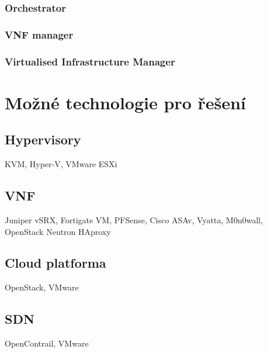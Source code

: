 	\subsubsection{Orchestrator}

	\subsubsection{VNF manager}

	\subsubsection{Virtualised Infrastructure Manager}



\section{Možné technologie pro řešení}

\subsection{Hypervisory} \label{sub:Hypervisor}

KVM, Hyper-V, VMware ESXi


\subsection{VNF}

Juniper vSRX, Fortigate VM, PFSense, Cisco ASAv, Vyatta, M0n0wall, OpenStack Neutron HAproxy

\subsection{Cloud platforma}

OpenStack, VMware

\subsection{SDN}

OpenContrail, VMware






